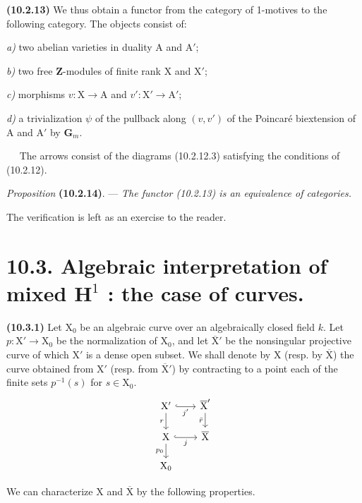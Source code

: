 \documentclass[11pt,leqno]{article}
\newcommand{\Page}[1]{\ifvmode\noindent\else\unskip\ \fi{\footnotesize\textcolor{gray}{[p.\,#1]}}\ \ignorespaces}
\begin{document}
\textbf{(10.2.13)} We thus obtain a functor from the category
of 1-motives to the following category. The objects consist of:

\noindent\textit{a)} two abelian varieties in duality
\(\mathrm{A}\) and \(\mathrm{A}'\);

\noindent\textit{b)} two free \(\mathbf{Z}\)-modules of finite
rank \(\mathrm{X}\) and \(\mathrm{X}'\);

\noindent\textit{c)} morphisms
\(v:\mathrm{X}\to\mathrm{A}\) and
\(v':\mathrm{X}'\to\mathrm{A}'\);

\noindent\textit{d)} a trivialization \(\psi\) of the pullback
along \((v,v')\) of the Poincaré biextension of
\(\mathrm{A}\) and \(\mathrm{A}'\) by \(\mathbf{G}_m\).

\Page{69}
The arrows consist of the diagrams (10.2.12.3) satisfying the conditions of (10.2.12).

\textit{Proposition} \textbf{(10.2.14)}. — \textit{The functor \textup{(10.2.13)} is an equivalence of categories.}

The verification is left as an exercise to the reader.

\section*{10.3. Algebraic interpretation of mixed \(\mathbf{H}^{1}\) : the case of curves.}

\textbf{(10.3.1)} Let \(\mathrm{X}_0\) be an algebraic curve over an algebraically closed field \(k\). Let \(p:\mathrm{X}'\to\mathrm{X}_0\) be the normalization of \(\mathrm{X}_0\), and let \(\overline{\mathrm{X}}'\) be the nonsingular projective curve of which \(\mathrm{X}'\) is a dense open subset. We shall denote by \(\mathrm{X}\) (resp. by \(\overline{\mathrm{X}}\)) the curve obtained from \(\mathrm{X}'\) (resp. from \(\overline{\mathrm{X}}'\)) by contracting to a point each of the finite sets \(p^{-1}(s)\) for \(s\in\mathrm{X}_0\).
\[
\begin{tikzcd}[column sep=2em,row sep=1.5em]
\mathrm{X}' \arrow[r,hook,"j'"'] \arrow[d,"r"']
  & \overline{\mathrm{X}}' \arrow[d,"\bar r"'] \\
\mathrm{X} \arrow[r,hook,"j"'] \arrow[d,"p_0"']
  & \overline{\mathrm{X}} \\
\mathrm{X}_0 &
\end{tikzcd}
\]

We can characterize \(\mathrm{X}\) and \(\overline{\mathrm{X}}\) by the following properties.
\end{document}
